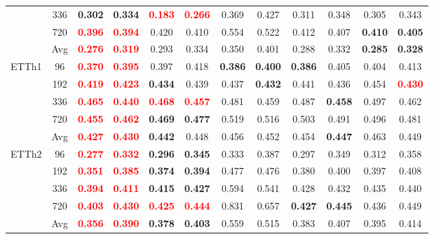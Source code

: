 \begin{table}[!htbp]
\begin{tabular}{c|c|cc|cc|cc|cc|cc}
& 336 & \textbf{0.302} & \textbf{0.334} & \textbf{\textcolor{red}{0.183}} & \textbf{\textcolor{red}{0.266}} & 0.369 & 0.427 & 0.311 & 0.348 & 0.305 & 0.343 \\
& 720 & \textbf{\textcolor{red}{0.396}} & \textbf{\textcolor{red}{0.394}} & 0.420 & 0.410 & 0.554 & 0.522 & 0.412 & 0.407 & \textbf{0.410} & \textbf{0.405} \\
& Avg & \textbf{\textcolor{red}{0.276}} & \textbf{\textcolor{red}{0.319}} & 0.293 & 0.334 & 0.350 & 0.401 & 0.288 & 0.332 & \textbf{0.285} & \textbf{0.328} \\
\midrule
\multirow{5}{*}{ETTh1}
& 96 & \textbf{\textcolor{red}{0.370}} & \textbf{\textcolor{red}{0.395}} & 0.397 & 0.418 & \textbf{0.386} & \textbf{0.400} & \textbf{0.386} & 0.405 & 0.404 & 0.413 \\
& 192 & \textbf{\textcolor{red}{0.419}} & \textbf{\textcolor{red}{0.423}} & \textbf{0.434} & 0.439 & 0.437 & \textbf{0.432} & 0.441 & 0.436 & 0.454 & \textbf{\textcolor{red}{0.430}} \\
& 336 & \textbf{\textcolor{red}{0.465}} & \textbf{\textcolor{red}{0.440}} & \textbf{\textcolor{red}{0.468}} & \textbf{\textcolor{red}{0.457}} & 0.481 & 0.459 & 0.487 & \textbf{0.458} & 0.497 & 0.462 \\
& 720 & \textbf{\textcolor{red}{0.455}} & \textbf{\textcolor{red}{0.462}} & \textbf{0.469} & \textbf{0.477} & 0.519 & 0.516 & 0.503 & 0.491 & 0.496 & 0.481 \\
& Avg & \textbf{\textcolor{red}{0.427}} & \textbf{\textcolor{red}{0.430}} & \textbf{0.442} & 0.448 & 0.456 & 0.452 & 0.454 & \textbf{0.447} & 0.463 & 0.449 \\
\midrule
\multirow{5}{*}{ETTh2}
& 96 & \textbf{\textcolor{red}{0.277}} & \textbf{\textcolor{red}{0.332}} & \textbf{0.296} & \textbf{0.345} & 0.333 & 0.387 & 0.297 & 0.349 & 0.312 & 0.358 \\
& 192 & \textbf{\textcolor{red}{0.351}} & \textbf{\textcolor{red}{0.385}} & \textbf{0.374} & \textbf{0.394} & 0.477 & 0.476 & 0.380 & 0.400 & 0.397 & 0.408 \\
& 336 & \textbf{\textcolor{red}{0.394}} & \textbf{\textcolor{red}{0.411}} & \textbf{0.415} & \textbf{0.427} & 0.594 & 0.541 & 0.428 & 0.432 & 0.435 & 0.440 \\
& 720 & \textbf{\textcolor{red}{0.403}} & \textbf{\textcolor{red}{0.430}} & \textbf{\textcolor{red}{0.425}} & \textbf{\textcolor{red}{0.444}} & 0.831 & 0.657 & \textbf{0.427} & \textbf{0.445} & 0.436 & 0.449 \\
& Avg & \textbf{\textcolor{red}{0.356}} & \textbf{\textcolor{red}{0.390}} & \textbf{0.378} & \textbf{0.403} & 0.559 & 0.515 & 0.383 & 0.407 & 0.395 & 0.414 \\

\end{tabular}
\end{table}
